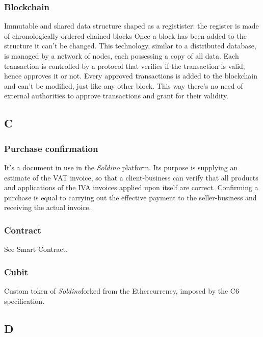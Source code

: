 \subsubsection*{Blockchain}
Immutable and shared data structure shaped as a registister: the register is made of chronologically-ordered chained blocks 
Once a block has been added to the structure it can't be changed. 
This technology, similar to a distributed database, is managed by a network of nodes, each possessing a copy of all data. Each transaction is controlled by a protocol that verifies if the transaction is valid, hence approves it or not. Every approved transactions is added to the blockchain and can't be modified, just like any other block. This way there's no need of external authorities to approve transactions and grant for their validity.

\subsection*{C}

\subsubsection*{Purchase confirmation}
It's a document in use in the \textit{Soldino} platform.
Its purpose is supplying an estimate of the VAT invoice, so that a client-business can verify that all products and applications of the IVA invoices applied upon itself are correct. Confirming a purchase is equal to carrying out the effective payment to the seller-business and receiving the actual invoice.


\subsubsection*{Contract}
See Smart Contract. 

\subsubsection*{Cubit}
Custom token of \textit{Soldino}\glosp forked from the Ether\glosp currency, imposed by the \glosp C6 specification.

\subsection*{D}


